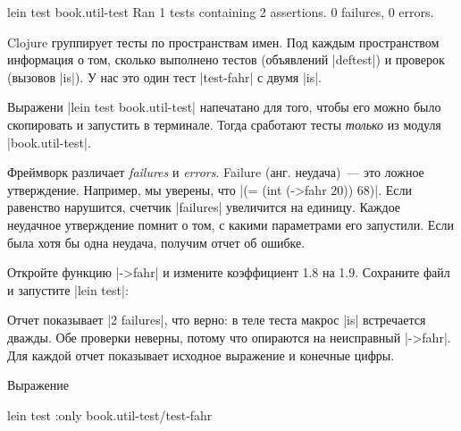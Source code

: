 \begin{english}
  \begin{text}
lein test book.util-test
Ran 1 tests containing 2 assertions.
0 failures, 0 errors.
  \end{text}
\end{english}

Clojure группирует тесты по пространствам имен. Под каждым пространством
информация о том, сколько выполнено тестов (объявлений \spverb|deftest|) и
проверок (вызовов \spverb|is|). У нас это один тест \spverb|test-fahr| с двумя
\spverb|is|.

Выражени \spverb|lein test book.util-test| напечатано для того, чтобы его можно
было скопировать и запустить в терминале. Тогда сработают тесты \emph{только} из
модуля \spverb|book.util-test|.

Фреймворк различает \emph{failures} и \emph{errors}. Failure (анг. неудача)~---
это ложное утверждение. Например, мы уверены, что \spverb|(= (int (->fahr 20)) 68)|.
Если равенство нарушится, счетчик \spverb|failures| увеличится на
единицу. Каждое неудачное утверждение помнит о том, с какими параметрами его
запустили. Если была хотя бы одна неудача, получим отчет об ошибке.

Откройте функцию \spverb|->fahr| и измените коэффициент 1.8 на 1.9. Сохраните
файл и запустите \spverb|lein test|:

\begin{english}
\end{english}

Отчет показывает \spverb|2 failures|, что верно: в теле теста макрос \spverb|is|
встречается дважды. Обе проверки неверны, потому что опираются на неисправный
\spverb|->fahr|. Для каждой отчет показывает исходное выражение и конечные
цифры.

Выражение

\begin{english}
  \begin{bash}
lein test :only book.util-test/test-fahr
  \end{bash}
\end{english}

